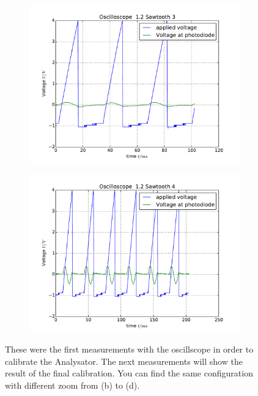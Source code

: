 \begin{figure}
\begin{subfigure}[b]{\picwidth}
        \includegraphics[width=\textwidth]{analysis/figures/12sawtooth3}
        \caption{}
    \end{subfigure}
    \begin{subfigure}[b]{\picwidth}
        \includegraphics[width=\textwidth]{analysis/figures/12sawtooth4}
        \caption{}
    \end{subfigure}
    \caption{These were the first measurements with the 
        oscillscope in order to calibrate the Analysator.
        The next measurements will show the result of the 
        final calibration. You can find the same configuration
        with different zoom from (b) to (d).}
    \label{fig:saw1}
\end{figure}
